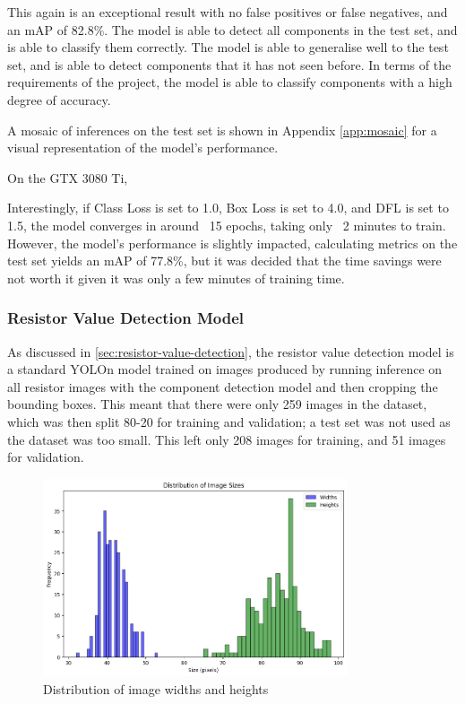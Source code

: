 This again is an exceptional result with no false positives or false negatives, and an mAP of 82.8\%. The model is able to detect all components in the test set, and is able to classify them correctly. The model is able to generalise well to the test set, and is able to detect components that it has not seen before. In terms of the requirements of the project, the model is able to classify components with a high degree of accuracy.

A mosaic of inferences on the test set is shown in Appendix \autoref{app:mosaic} for a visual representation of the model's performance. 

  
On the GTX 3080 Ti, 
  
Interestingly, if Class Loss is set to 1.0, Box Loss is set to 4.0, and DFL is set to 1.5, the model converges in around ~15 epochs, taking only ~2 minutes to train. However, the model's performance is slightly impacted, calculating metrics on the test set yields an mAP of 77.8\%, but it was decided that the time savings were not worth it given it was only a few minutes of training time.


\subsubsection{Resistor Value Detection Model}
As discussed in \autoref{sec:resistor-value-detection}, the resistor value detection model is a standard YOLOn model trained on images produced by running inference on all resistor images with the component detection model and then cropping the bounding boxes. This meant that there were only 259 images in the dataset, which was then split 80-20 for training and validation; a test set was not used as the dataset was too small. This left only 208 images for training, and 51 images for validation.

\begin{figure}[H]
  \centering
  \includegraphics[width=0.8\textwidth]{imgs/graphs/pixel_distrib.png}
  \caption{Distribution of image widths and heights}
  \label{fig:pixel-distrib}
\end{figure}

